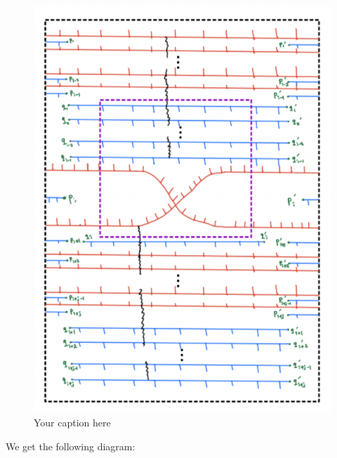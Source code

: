 \begin{figure}[H] %
    \centering
    \includegraphics[width=\linewidth]{diagrams/theorem12/13.png} %
    \caption{Your caption here}
    \label{fig:your-label}
\end{figure}

We get the following diagram:

